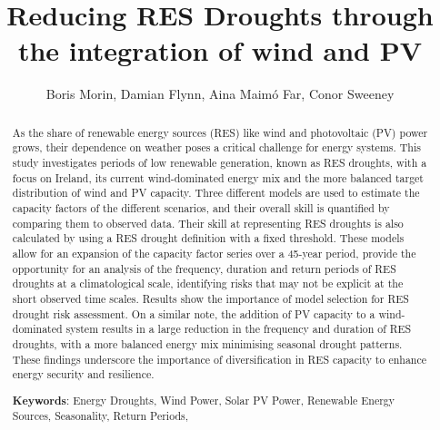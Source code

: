 \documentclass[a4paper, 11pt]{article}
\title{Reducing RES Droughts through the integration of wind and PV}
\author{Boris Morin, Damian Flynn, Aina Maimó Far, Conor Sweeney}
\begin{document}
\maketitle

\begin{abstract}

\noindent As the share of renewable energy sources (RES) like wind and photovoltaic (PV) power grows, their dependence on weather poses a critical challenge for energy systems. This study investigates periods of low renewable generation, known as RES droughts, with a focus on Ireland, its current wind-dominated energy mix and the more balanced target distribution of wind and PV capacity. Three different models are used to estimate the capacity factors of the different scenarios, and their overall skill is quantified by comparing them to observed data. Their skill at representing RES droughts is also calculated by using a RES drought definition with a fixed threshold. These models allow for an expansion of the capacity factor series over a 45-year period, provide the opportunity for an analysis of the frequency, duration and return periods of RES droughts at a climatological scale, identifying risks that may not be explicit at the short observed time scales. Results show the importance of model selection for RES drought risk assessment. On a similar note, the addition of PV capacity to a wind-dominated system results in a large reduction in the frequency and duration of RES droughts, with a more balanced energy mix minimising seasonal drought patterns. These findings underscore the importance of diversification in RES capacity to enhance energy security and resilience.



\textbf{Keywords}: Energy Droughts, Wind Power, Solar PV Power, Renewable Energy Sources, Seasonality, Return Periods, 
\end{abstract}
\end{document}
